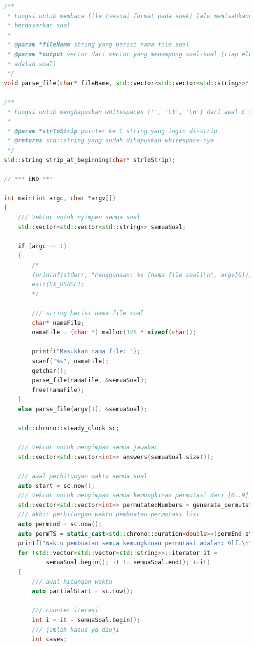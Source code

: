 \documentclass{article}
\begin{document}
\begin{lstlisting}[caption = main.cpp, language = c++]
/**
 * Fungsi untuk membaca file (sesuai format pada spek) lalu memisahkannya
 * berdasarkan soal
 *
 * @param *fileName string yang berisi nama file soal
 * @param *output vector dari vector yang menampung soal-soal (tiap elemen
 * adalah soal)
 */
void parse_file(char* fileName, std::vector<std::vector<std::string>>* output);

/**
 * Fungsi untuk menghapuskan whitespaces ('', '\t', '\n') dari awal C string
 *
 * @param *strToStrip pointer ke C string yang ingin di-strip
 * @returns std::string yang sudah dihapuskan whitespace-nya
 */
std::string strip_at_beginning(char* strToStrip);

// *** END ***

int main(int argc, char *argv[])
{
    /// Vektor untuk nyimpen semua soal
    std::vector<std::vector<std::string>> semuaSoal;

    if (argc == 1)
    {
        /*
        fprintnf(stderr, "Penggunaan: %s [nama file soal]\n", argv[0]);
        exit(EX_USAGE);
        */

        /// string berisi nama file soal
        char* namaFile;
        namaFile = (char *) malloc(128 * sizeof(char));

        printf("Masukkan nama file: ");
        scanf("%s", namaFile);
        getchar();
        parse_file(namaFile, &semuaSoal);
        free(namaFile);
    }
    else parse_file(argv[1], &semuaSoal);

    std::chrono::steady_clock sc;

    /// Vektor untuk menyimpan semua jawaban
    std::vector<std::vector<int>> answers(semuaSoal.size());

    /// awal perhitungan waktu semua soal
    auto start = sc.now();
    /// Vektor untuk menyimpan semua kemungkinan permutasi dari [0..9]
    std::vector<std::vector<int>> permutatedNumbers = generate_permutated_numbers(MAX_UNIQUE_LETTERS);
    /// akhir perhitungan waktu pembuatan permutasi list
    auto permEnd = sc.now();
    auto permTS = static_cast<std::chrono::duration<double>>(permEnd-start);
    printf("Waktu pembuatan semua kemungkinan permutasi adalah: %lf.\n\n", permTS.count());
    for (std::vector<std::vector<std::string>>::iterator it =
            semuaSoal.begin(); it != semuaSoal.end(); ++it)
    {
        /// awal hitungan waktu
        auto partialStart = sc.now();

        /// counter iterasi
        int i = it - semuaSoal.begin();
        /// jumlah kasus yg diuji
        int cases;


\end{lstlisting}
\end{document}
